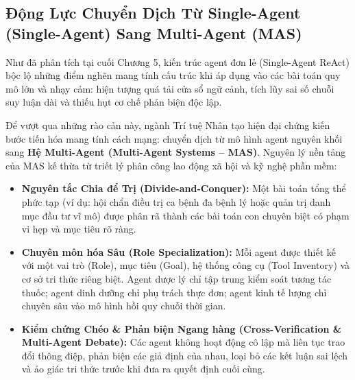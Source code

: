 \documentclass[12pt,a4paper]{report}
\begin{document}
\subsection{Động Lực Chuyển Dịch Từ Single-Agent (Single-Agent) Sang Multi-Agent (MAS)}
Như đã phân tích tại cuối Chương 5, kiến trúc agent đơn lẻ (Single-Agent ReAct) bộc lộ những điểm nghẽn mang tính cấu trúc khi áp dụng vào các bài toán quy mô lớn và nhạy cảm: hiện tượng quá tải cửa sổ ngữ cảnh, tích lũy sai số chuỗi suy luận dài và thiếu hụt cơ chế phản biện độc lập. 

Để vượt qua những rào cản này, ngành Trí tuệ Nhân tạo hiện đại chứng kiến bước tiến hóa mang tính cách mạng: chuyển dịch từ mô hình agent nguyên khối sang \textbf{Hệ Multi-Agent (Multi-Agent Systems -- MAS)}. Nguyên lý nền tảng của MAS kế thừa từ triết lý phân công lao động xã hội và kỹ nghệ phần mềm:
\begin{itemize}[leftmargin=1.2cm]
    \item \textbf{Nguyên tắc Chia để Trị (Divide-and-Conquer):} Một bài toán tổng thể phức tạp (ví dụ: hội chẩn điều trị ca bệnh đa bệnh lý hoặc quản trị danh mục đầu tư vĩ mô) được phân rã thành các bài toán con chuyên biệt có phạm vi hẹp và mục tiêu rõ ràng.
    \item \textbf{Chuyên môn hóa Sâu (Role Specialization):} Mỗi agent được thiết kế với một vai trò (Role), mục tiêu (Goal), hệ thống công cụ (Tool Inventory) và cơ sở tri thức riêng biệt. Agent dược lý chỉ tập trung kiểm soát tương tác thuốc; agent dinh dưỡng chỉ phụ trách thực đơn; agent kinh tế lượng chỉ chuyên sâu vào mô hình hồi quy chuỗi thời gian.
    \item \textbf{Kiểm chứng Chéo \& Phản biện Ngang hàng (Cross-Verification \& Multi-Agent Debate):} Các agent không hoạt động cô lập mà liên tục trao đổi thông điệp, phản biện các giả định của nhau, loại bỏ các kết luận sai lệch và ảo giác tri thức trước khi đưa ra quyết định cuối cùng.
\end{itemize}
\end{document}
